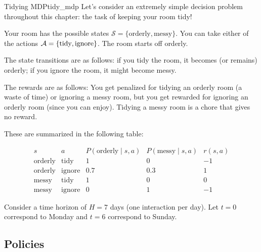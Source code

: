 \documentclass[\main/main]{subfiles}
\begin{document}
\begin{example}{Tidying MDP}{tidy_mdp}
    Let's consider an extremely simple decision problem throughout this chapter: the task of keeping your room tidy!

    Your room has the possible states $\mathcal{S} = \{ \text{orderly}, \text{messy} \}$. You can take either of the actions $\mathcal{A} = \{ \text{tidy}, \text{ignore} \}$. The room starts off orderly.
    
    The state transitions are as follows: if you tidy the room, it becomes (or remains) orderly; if you ignore the room, it might become messy.
    
    The rewards are as follows: You get penalized for tidying an orderly room (a waste of time) or ignoring a messy room, but you get rewarded for ignoring an orderly room (since you can enjoy). Tidying a messy room is a chore that gives no reward.
    
    These are summarized in the following table:

    \[
    \begin{array}{ccccc}
        s & a & P(\text{orderly} \mid s, a) & P(\text{messy} \mid s, a) & r(s, a) \\
        \text{orderly} & \text{tidy} & 1 & 0 & -1 \\
        \text{orderly} & \text{ignore} & 0.7 & 0.3 & 1 \\
        \text{messy} & \text{tidy} & 1 & 0 & 0 \\
        \text{messy} & \text{ignore} & 0 & 1 & -1
    \end{array}
    \]

    Consider a time horizon of $H = 7$ days (one interaction per day). Let $t = 0$ correspond to Monday and $t = 6$ correspond to Sunday.
\end{example}

\subsection{Policies}
\end{document}
